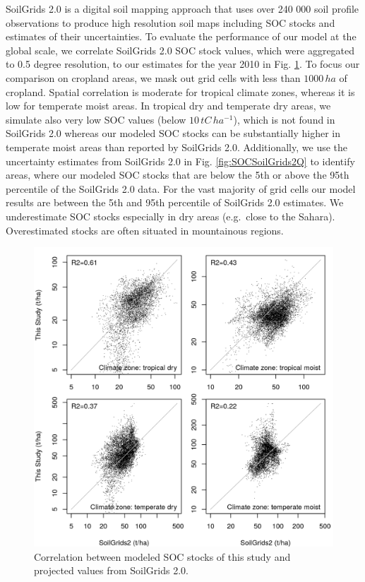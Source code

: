 \documentclass[gc, manuscript]{copernicus}
\begin{document}
SoilGrids 2.0 \citep{poggio_soilgrids_2021} is a digital soil mapping approach that uses over 240 000 soil profile observations to produce high resolution soil maps including SOC stocks and estimates of their uncertainties. To evaluate the performance of our model at the global scale, we correlate SoilGrids 2.0 SOC stock values, which were aggregated to 0.5 degree resolution, to our estimates for the year 2010 in Fig. \ref{fig:SOCSoilGrids2}. To focus our comparison on cropland areas, we mask out grid cells with less than \(1000\,\unit{ha}\) of cropland. Spatial correlation is moderate for tropical climate zones, whereas it is low for temperate moist areas. In tropical dry and temperate dry areas, we simulate also very low SOC values (below \(10\,\unit{tC\,ha^{-1}}\)), which is not found in SoilGrids 2.0 whereas our modeled SOC stocks can be substantially higher in temperate moist areas than reported by SoilGrids 2.0.
Additionally, we use the uncertainty estimates from SoilGrids 2.0 in Fig. \ref{fig:SOCSoilGrids2Q} to identify areas, where our modeled SOC stocks that are below the 5th or above the 95th percentile of the SoilGrids 2.0 data.
For the vast majority of grid cells our model results are between the 5th and 95th percentile of SoilGrids 2.0 estimates. We underestimate SOC stocks especially in dry areas (e.g.~close to the Sahara). Overestimated stocks are often situated in mountainous regions.

\begin{figure}[h]
\includegraphics[width=13cm]{../ResultNotebooks/Output/Images/scatterCompareSoilGrids2_2010_lu} \caption{Correlation between modeled SOC stocks of this study and projected values from SoilGrids 2.0.}\label{fig:SOCSoilGrids2}
\end{figure}
\end{document}
